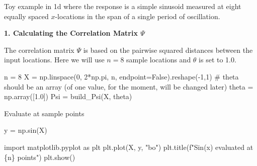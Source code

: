 \documentclass[
  letterpaper,
  DIV=11,
  numbers=noendperiod]{scrreprt}
\newenvironment{Shaded}{\begin{snugshade}}{\end{snugshade}}
\newcommand{\CommentTok}[1]{\textcolor[rgb]{0.37,0.37,0.37}{#1}}
\newcommand{\DecValTok}[1]{\textcolor[rgb]{0.68,0.00,0.00}{#1}}
\newcommand{\FloatTok}[1]{\textcolor[rgb]{0.68,0.00,0.00}{#1}}
\newcommand{\ImportTok}[1]{\textcolor[rgb]{0.00,0.46,0.62}{#1}}
\newcommand{\NormalTok}[1]{\textcolor[rgb]{0.00,0.23,0.31}{#1}}
\newcommand{\OperatorTok}[1]{\textcolor[rgb]{0.37,0.37,0.37}{#1}}
\newcommand{\SpecialCharTok}[1]{\textcolor[rgb]{0.37,0.37,0.37}{#1}}
\newcommand{\SpecialStringTok}[1]{\textcolor[rgb]{0.13,0.47,0.30}{#1}}
\newcommand{\StringTok}[1]{\textcolor[rgb]{0.13,0.47,0.30}{#1}}
\newcommand{\VariableTok}[1]{\textcolor[rgb]{0.07,0.07,0.07}{#1}}
\begin{document}
\begin{tcolorbox}[enhanced jigsaw, arc=.35mm, colback=white, bottomtitle=1mm, toprule=.15mm, coltitle=black, titlerule=0mm, leftrule=.75mm, title=\textcolor{quarto-callout-note-color}{\faInfo}\hspace{0.5em}{Example: Sinusoid Function}, opacitybacktitle=0.6, breakable, colbacktitle=quarto-callout-note-color!10!white, opacityback=0, toptitle=1mm, rightrule=.15mm, left=2mm, colframe=quarto-callout-note-color-frame, bottomrule=.15mm]

Toy example in 1d where the response is a simple sinusoid measured at
eight equally spaced \(x\)-locations in the span of a single period of
oscillation.

\textbf{1. Calculating the Correlation Matrix \(\Psi\)}

The correlation matrix \(\Psi\) is based on the pairwise squared
distances between the input locations. Here we will use \(n=8\) sample
locations and \(\theta\) is set to 1.0.

\begin{Shaded}
\begin{Highlighting}[]
\NormalTok{n }\OperatorTok{=} \DecValTok{8}
\NormalTok{X }\OperatorTok{=}\NormalTok{ np.linspace(}\DecValTok{0}\NormalTok{, }\DecValTok{2}\OperatorTok{*}\NormalTok{np.pi, n, endpoint}\OperatorTok{=}\VariableTok{False}\NormalTok{).reshape(}\OperatorTok{{-}}\DecValTok{1}\NormalTok{,}\DecValTok{1}\NormalTok{)}
\CommentTok{\# theta should be an array (of one value, for the moment, will be changed later)}
\NormalTok{theta }\OperatorTok{=}\NormalTok{ np.array([}\FloatTok{1.0}\NormalTok{])}
\NormalTok{Psi }\OperatorTok{=}\NormalTok{ build\_Psi(X, theta)}
\end{Highlighting}
\end{Shaded}

Evaluate at sample points

\begin{Shaded}
\begin{Highlighting}[]
\NormalTok{y }\OperatorTok{=}\NormalTok{ np.sin(X)}
\end{Highlighting}
\end{Shaded}

\begin{Shaded}
\begin{Highlighting}[]
\ImportTok{import}\NormalTok{ matplotlib.pyplot }\ImportTok{as}\NormalTok{ plt}
\NormalTok{plt.plot(X, y, }\StringTok{"bo"}\NormalTok{)}
\NormalTok{plt.title(}\SpecialStringTok{f"Sin(x) evaluated at }\SpecialCharTok{\{}\NormalTok{n}\SpecialCharTok{\}}\SpecialStringTok{ points"}\NormalTok{)}
\NormalTok{plt.show()}
\end{Highlighting}
\end{Shaded}


\end{tcolorbox}
\end{document}
